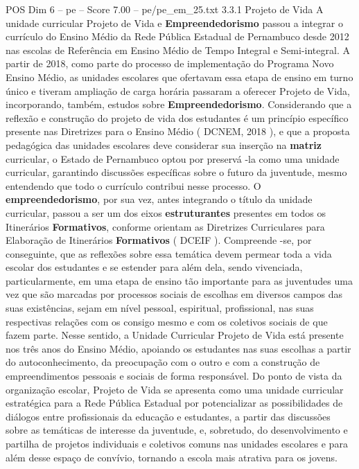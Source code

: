 \begin{textsample}{POS Dim 6 – pe – Score 7.00 – pe/pe\_em\_25.txt}  \label{ex:f6_pos_254}
3.3.1 Projeto de Vida A unidade curricular Projeto de Vida e \textbf{Empreendedorismo} passou a integrar o currículo do Ensino Médio da Rede Pública Estadual de Pernambuco desde 2012 nas escolas de Referência em Ensino Médio de Tempo Integral e Semi-integral.
A partir de 2018, como parte do processo de implementação do Programa Novo Ensino Médio, as unidades escolares que ofertavam essa etapa de ensino em turno único e tiveram ampliação de carga horária passaram a oferecer Projeto de Vida, incorporando, também, estudos sobre \textbf{Empreendedorismo}.
Considerando que a reflexão e construção do projeto de vida dos estudantes é um princípio específico presente nas Diretrizes para o Ensino Médio ( DCNEM, 2018 ), e que a proposta pedagógica das unidades escolares deve considerar sua inserção na \textbf{matriz} curricular, o Estado de Pernambuco optou por preservá -la como uma unidade curricular, garantindo discussões específicas sobre o futuro da juventude, mesmo entendendo que todo o currículo contribui nesse processo.
O \textbf{empreendedorismo}, por sua vez, antes integrando o título da unidade curricular, passou a ser um dos eixos \textbf{estruturantes} presentes em todos os Itinerários \textbf{Formativos}, conforme orientam as Diretrizes Curriculares para Elaboração de Itinerários \textbf{Formativos} ( DCEIF ).
Compreende -se, por conseguinte, que as reflexões sobre essa temática devem permear toda a vida escolar dos estudantes e se estender para além dela, sendo vivenciada, particularmente, em uma etapa de ensino tão importante para as juventudes uma vez que são marcadas por processos sociais de escolhas em diversos campos das suas existências, sejam em nível pessoal, espiritual, profissional, nas suas respectivas relações com os consigo mesmo e com os coletivos sociais de que fazem parte.
Nesse sentido, a Unidade Curricular Projeto de Vida está presente nos três anos do Ensino Médio, apoiando os estudantes nas suas escolhas a partir do autoconhecimento, da preocupação com o outro e com a construção de empreendimentos pessoais e sociais de forma responsável.
Do ponto de vista da organização escolar, Projeto de Vida se apresenta como uma unidade curricular estratégica para a Rede Pública Estadual por potencializar as possibilidades de diálogos entre profissionais da educação e estudantes, a partir das discussões sobre as temáticas de interesse da juventude, e, sobretudo, do desenvolvimento e partilha de projetos individuais e coletivos comuns nas unidades escolares e para além desse espaço de convívio, tornando a escola mais atrativa para os jovens.

\end{textsample}
